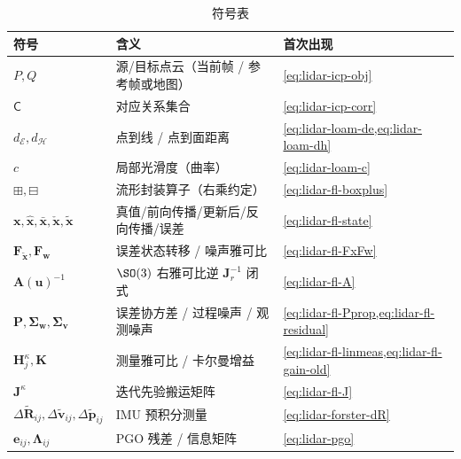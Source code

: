 \begin{table}[H]\centering\small
\caption{符号表}
\begin{tabular}{lll}
\toprule
符号 & 含义 & 首次出现 \\
\midrule
$P,Q$ & 源/目标点云（当前帧 / 参考帧或地图） & \cref{eq:lidar-icp-obj} \\
$\mathsf{C}$ & 对应关系集合 & \cref{eq:lidar-icp-corr} \\
$d_{\mathcal{E}},d_{\mathcal{H}}$ & 点到线 / 点到面距离 & \cref{eq:lidar-loam-de,eq:lidar-loam-dh} \\
$c$ & 局部光滑度（曲率） & \cref{eq:lidar-loam-c} \\
$\boxplus,\boxminus$ & 流形封装算子（右乘约定） & \cref{eq:lidar-fl-boxplus} \\
$\mathbf{x},\hat{\mathbf{x}},\bar{\mathbf{x}},\check{\mathbf{x}},\tilde{\mathbf{x}}$ & 真值/前向传播/更新后/反向传播/误差 & \cref{eq:lidar-fl-state} \\
$\mathbf{F}_{\tilde{\mathbf{x}}},\mathbf{F}_{\mathbf{w}}$ & 误差状态转移 / 噪声雅可比 & \cref{eq:lidar-fl-FxFw} \\
$\mathbf{A}(\mathbf{u})^{-1}$ & $\SO(3)$ 右雅可比逆 $\mathbf{J}_r^{-1}$ 闭式 & \cref{eq:lidar-fl-A} \\
$\mathbf{P},\boldsymbol{\Sigma}_{\mathbf{w}},\boldsymbol{\Sigma}_{\mathbf{v}}$ & 误差协方差 / 过程噪声 / 观测噪声 & \cref{eq:lidar-fl-Pprop,eq:lidar-fl-residual} \\
$\mathbf{H}^\kappa_j,\mathbf{K}$ & 测量雅可比 / 卡尔曼增益 & \cref{eq:lidar-fl-linmeas,eq:lidar-fl-gain-old} \\
$\mathbf{J}^\kappa$ & 迭代先验搬运矩阵 & \cref{eq:lidar-fl-J} \\
$\Delta\tilde{\mathbf{R}}_{ij},\Delta\tilde{\mathbf{v}}_{ij},\Delta\tilde{\mathbf{p}}_{ij}$ & IMU 预积分测量 & \cref{eq:lidar-forster-dR} \\
$\mathbf{e}_{ij},\boldsymbol{\Lambda}_{ij}$ & PGO 残差 / 信息矩阵 & \cref{eq:lidar-pgo} \\
\bottomrule
\end{tabular}
\end{table}

